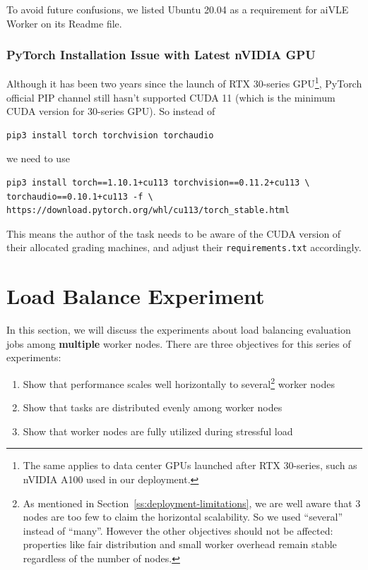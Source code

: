 To avoid future confusions, we listed Ubuntu 20.04 as a requirement for aiVLE Worker on its Readme file.

\subsubsection{PyTorch Installation Issue with Latest nVIDIA GPU}
Although it has been two years since the launch of RTX 30-series GPU\footnote{The same applies to data center GPUs launched after RTX 30-series, such as nVIDIA A100 used in our deployment.}, PyTorch official PIP channel still hasn't supported CUDA 11 (which is the minimum CUDA version for 30-series GPU). So instead of 
\begin{code}
\begin{verbatim}
pip3 install torch torchvision torchaudio
\end{verbatim}
\end{code}
we need to use
\begin{code}
\begin{verbatim}
pip3 install torch==1.10.1+cu113 torchvision==0.11.2+cu113 \
torchaudio==0.10.1+cu113 -f \
https://download.pytorch.org/whl/cu113/torch_stable.html
\end{verbatim}
\end{code}

This means the author of the task needs to be aware of the CUDA version of their allocated grading machines, and adjust their \texttt{requirements.txt} accordingly.

\section{Load Balance Experiment}
\label{s:load-balance-exp}
In this section, we will discuss the experiments about load balancing evaluation jobs among \textbf{multiple} worker nodes. There are three objectives for this series of experiments:

\begin{enumerate}
    \item Show that performance scales well horizontally to several\footnote{As mentioned in Section~\ref{ss:deployment-limitations}, we are well aware that 3 nodes are too few to claim the horizontal scalability. So we used ``several'' instead of ``many''. However the other objectives should not be affected: properties like fair distribution and small worker overhead remain stable regardless of the number of nodes.} worker nodes
    \item Show that tasks are distributed evenly among worker nodes
    \item Show that worker nodes are fully utilized during stressful load
\end{enumerate}

